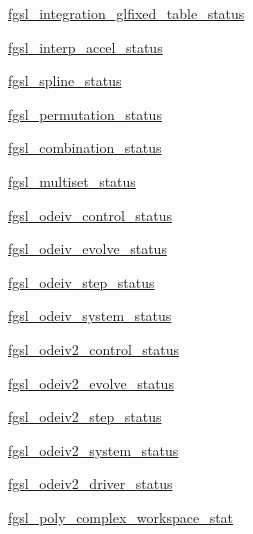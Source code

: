\begin{DoxyCompactItemize}
\item 
\hyperlink{interfacefgsl__well__defined_ab90b0b9d8c75b94409b749a87c6deed0}{fgsl\-\_\-integration\-\_\-glfixed\-\_\-table\-\_\-status}
\item 
\hyperlink{interfacefgsl__well__defined_a6d96ec1eb035e67c087c49650e447a01}{fgsl\-\_\-interp\-\_\-accel\-\_\-status}
\item 
\hyperlink{interfacefgsl__well__defined_ad7813b7c806549ae5313bb4d0cf0f6dc}{fgsl\-\_\-spline\-\_\-status}
\item 
\hyperlink{interfacefgsl__well__defined_ae2019a88a04399d84a8a9ff0939b9fd0}{fgsl\-\_\-permutation\-\_\-status}
\item 
\hyperlink{interfacefgsl__well__defined_a5c1398f32d6a7a13b8827e2fc5990b12}{fgsl\-\_\-combination\-\_\-status}
\item 
\hyperlink{interfacefgsl__well__defined_a18cc5790e386d40f3c63a560d9c0126c}{fgsl\-\_\-multiset\-\_\-status}
\item 
\hyperlink{interfacefgsl__well__defined_a4e14590dbb12724805a7090428a9cecf}{fgsl\-\_\-odeiv\-\_\-control\-\_\-status}
\item 
\hyperlink{interfacefgsl__well__defined_a6924068e0d5d62d91a69786571db90f9}{fgsl\-\_\-odeiv\-\_\-evolve\-\_\-status}
\item 
\hyperlink{interfacefgsl__well__defined_a1c76c474049ea289f348687c730f2f2a}{fgsl\-\_\-odeiv\-\_\-step\-\_\-status}
\item 
\hyperlink{interfacefgsl__well__defined_a4c099e60eff73f6d01a3e6ef8891a521}{fgsl\-\_\-odeiv\-\_\-system\-\_\-status}
\item 
\hyperlink{interfacefgsl__well__defined_aef92f52d97a8ab3204731f7d79dba32b}{fgsl\-\_\-odeiv2\-\_\-control\-\_\-status}
\item 
\hyperlink{interfacefgsl__well__defined_af310c60d5bc311ea9b22d04f090ec6ef}{fgsl\-\_\-odeiv2\-\_\-evolve\-\_\-status}
\item 
\hyperlink{interfacefgsl__well__defined_a037f0ecc2cae0b48a28fbc0a9e85dcbc}{fgsl\-\_\-odeiv2\-\_\-step\-\_\-status}
\item 
\hyperlink{interfacefgsl__well__defined_a447d26ad4612e3d1006cdd6fd4a0373e}{fgsl\-\_\-odeiv2\-\_\-system\-\_\-status}
\item 
\hyperlink{interfacefgsl__well__defined_a05c7f5e4b645b1d7902165a47d3926dc}{fgsl\-\_\-odeiv2\-\_\-driver\-\_\-status}
\item 
\hyperlink{interfacefgsl__well__defined_aa0223410e3db936f817a42eecf4e7be7}{fgsl\-\_\-poly\-\_\-complex\-\_\-workspace\-\_\-stat}

\end{DoxyCompactItemize}
